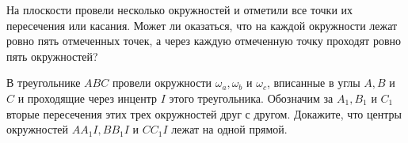 На плоскости провели несколько окружностей и отметили все точки их пересечения или касания. Может ли оказаться, что на каждой окружности лежат ровно пять отмеченных точек, а через каждую отмеченную точку проходят ровно пять окружностей?

\newpage

\hspace{3mm}

В треугольнике $A B C$ провели окружности $\omega_a, \omega_b$ и $\omega_c$, вписанные в углы $A, B$ и $C$ и проходящие через инцентр $I$ этого треугольника. Обозначим за $A_1, B_1$ и $C_1$ вторые пересечения этих трех окружностей друг с другом. Докажите, что центры окружностей $A A_1 I, B B_1 I$ и $C C_1 I$ лежат на одной прямой.